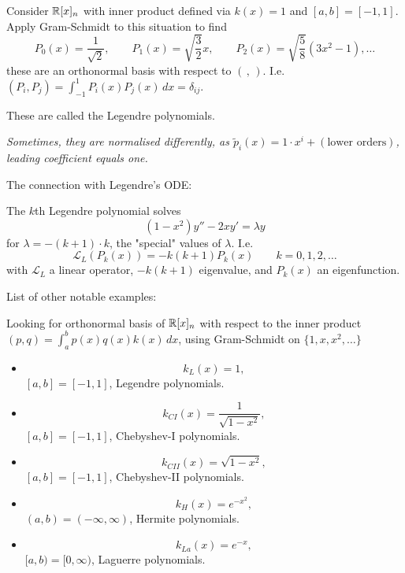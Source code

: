 \documentclass[10pt, a4paper]{article}
\begin{document}
\begin{example}
    Consider $\mathbb{R}[x]_n$ with inner product defined via $k(x) = 1$ and $[a, b] = [-1, 1]$.
    Apply Gram-Schmidt to this situation to find
    \[
    P_0(x) = \frac{1}{\sqrt{2}},\qquad P_1(x) = \sqrt{\frac{3}{2}}x,\qquad P_2(x) = \sqrt{\frac{5}{8}}(3x ^ 2 - 1),\dotsc
    \]
    these are an orthonormal basis with respect to $(\,,\,)$.
    I.e. $(P_i, P_j) = \int_{-1}^{1}P_i(x)P_j(x)\,dx = \delta_{ij}$.

    These are called the Legendre polynomials.

    \textit{Sometimes,
    they are normalised differently,
    as $\tilde{p}_i(x) = 1 \cdot x ^ {i} + (\text{lower orders})$,
    leading coefficient equals one.}

    The connection with Legendre's ODE:

    The $k$th Legendre polynomial solves
    \[
    (1 - x ^ 2)y'' - 2xy' = \lambda y
    \]
    for $\lambda = -(k + 1) \cdot k$,
    the "special" values of $\lambda$.
    I.e.
    \[
    \mathcal{L}_L(P_k(x)) = -k(k + 1)P_k(x)\qquad k = 0, 1, 2, \dotsc
    \]
    with $\mathcal{L}_L$ a linear operator,
    $-k(k + 1)$ eigenvalue,
    and $P_k(x)$ an eigenfunction.
\end{example}

List of other notable examples:

Looking for orthonormal basis of $\mathbb{R}[x]_n$ with respect to the inner product $(p, q) = \int_{a}^{b}p(x)q(x)k(x)\,dx$,
using Gram-Schmidt on $\{1, x, x ^ 2, \dotsc\}$
\begin{itemize}
    \item
    \[
    k_L(x) = 1,
    \]
    $[a, b] = [-1, 1]$,
    Legendre polynomials.

    \item
    \[
    k_{CI}(x) = \frac{1}{\sqrt{1 - x ^ 2}},
    \]
    $[a, b] = [-1, 1]$,
    Chebyshev-I polynomials.

    \item
    \[
    k_{CII}(x) = \sqrt{1 - x ^ 2},
    \]
    $[a, b] = [-1, 1]$,
    Chebyshev-II polynomials.

    \item
    \[
    k_H(x) = e ^ {-x ^ 2},
    \]
    $(a, b) = (-\infty, \infty)$,
    Hermite polynomials.

    \item
    \[
    k_{La}(x) = e ^ {-x},
    \]
    $[a, b) = [0, \infty)$,
    Laguerre polynomials.
\end{itemize}
\end{document}
